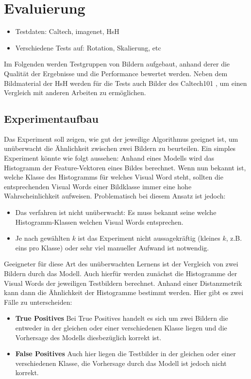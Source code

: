 \chapter{Evaluierung}

\begin{itemize}
	\item Testdaten: Caltech, imagenet, HsH
	\item Verschiedene Tests auf: Rotation, Skalierung, etc
\end{itemize}

Im Folgenden werden Testgruppen von Bildern aufgebaut, anhand derer die Qualität der Ergebnisse und die Performance bewertet werden. Neben dem Bildmaterial der HsH werden für die Tests auch Bilder des Caltech101 \cite{cal2004}, um einen Vergleich mit anderen Arbeiten zu ermöglichen.

\section{Experimentaufbau}

Das Experiment soll zeigen, wie gut der jeweilige Algorithmus geeignet ist, um unüberwacht die Ähnlichkeit zwischen zwei Bildern zu beurteilen. Ein simples Experiment könnte wie folgt aussehen: Anhand eines Modells wird das Histogramm der Feature-Vektoren eines Bildes berechnet. Wenn nun bekannt ist, welche Klasse des Histogramms für welches Visual Word steht, sollten die entsprechenden Visual Words einer Bildklasse immer eine hohe Wahrscheinlichkeit aufweisen. Problematisch bei diesem Ansatz ist jedoch:

\begin{itemize}
	\item Das verfahren ist nicht unüberwacht: Es muss bekannt seine welche Histogramm-Klassen welchen Visual Words entsprechen. 
	\item Je nach gewählten $k$ ist das Experiment nicht aussagekräftig (kleines $k$, z.B. eins pro Klasse) oder sehr viel manueller Aufwand ist notwendig.
\end{itemize}

Geeigneter für diese Art des unüberwachten Lernens ist der Vergleich von zwei Bildern durch das Modell. Auch hierfür werden zunächst die Histogramme der Visual Words der jeweiligen Testbildern berechnet. Anhand einer Distanzmetrik kann dann die Ähnlichkeit der Histogramme bestimmt werden. Hier gibt es zwei Fälle zu unterscheiden:

\begin{itemize}
	\item \textbf{True Positives} Bei True Positives handelt es sich um zwei Bildern die entweder in der gleichen oder einer verschiedenen Klasse liegen und die Vorhersage des Modells diesbezüglich korrekt ist.
	\item \textbf{False Positives} Auch hier liegen die Testbilder in der gleichen oder einer verschiedenen Klasse, die Vorhersage durch das Modell ist jedoch nicht korrekt.
\end{itemize}

